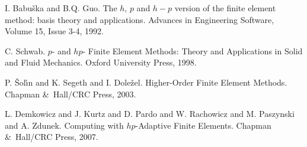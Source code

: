 
\begin{thebibliography}{10}

{\sc I. Babu\v{s}ka and B.Q. Guo}. {The $h$, $p$ and $h-p$ version of the finite element method: basis theory and applications}. Advances in Engineering Software, Volume 15, Issue 3-4, 1992.



{\sc C. Schwab}. {$p$- and $hp$- Finite Element Methods: Theory and Applications in Solid and Fluid Mechanics}. Oxford University Press, 1998.



{\sc P. \v{S}ol\'{\i}n and K. Segeth and I. Dole\v{z}el}. {Higher-Order Finite Element Methods}. Chapman \&\ Hall/CRC Press, 2003.



{\sc L. Demkowicz and J. Kurtz and D. Pardo and W. Rachowicz and M. Paszynski and A. Zdunek}. {Computing with $hp$-Adaptive Finite Elements}. Chapman \&\ Hall/CRC Press, 2007.

\end{thebibliography}
